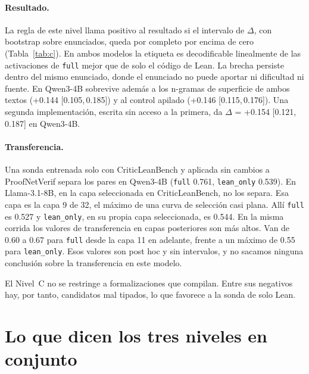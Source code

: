 \documentclass[10pt]{article}
\newcommand{\vr}[1]{\texttt{#1}}
\newcommand{\D}{\Delta}
\newcommand{\ic}[2]{[#1,\,#2]}
\begin{document}
\paragraph{Resultado.}
La regla de este nivel llama positivo al resultado si el intervalo de $\D$, con bootstrap sobre enunciados, queda
por completo por encima de cero (Tabla~\ref{tab:c}). En ambos modelos la etiqueta es decodificable linealmente de las activaciones de \vr{full} mejor que de solo el código de Lean.
La brecha persiste dentro del mismo enunciado, donde el enunciado no puede aportar ni dificultad ni fuente. En
Qwen3-4B sobrevive además a los n-gramas de superficie de ambos textos (+0.144 \ic{0.105}{0.185}) y al control
apilado (+0.146 \ic{0.115}{0.176}). Una segunda implementación, escrita sin acceso a la primera, da $\D$ = +0.154 \ic{0.121}{0.187} en Qwen3-4B.

\paragraph{Transferencia.}
Una sonda entrenada solo con CriticLeanBench y aplicada sin cambios a ProofNetVerif separa los pares en Qwen3-4B
(\vr{full} 0.761, \vr{lean\_only} 0.539). En Llama-3.1-8B, en la capa seleccionada en CriticLeanBench, no los separa.
Esa capa es la capa 9 de 32, el máximo de una curva de selección casi plana. Allí \vr{full} es 0.527 y
\vr{lean\_only}, en su propia capa seleccionada, es 0.544. En la misma corrida los valores de transferencia en capas
posteriores son más altos. Van de 0.60 a 0.67 para \vr{full} desde la capa 11 en adelante, frente a un máximo de
0.55 para \vr{lean\_only}. Esos valores son post hoc y sin intervalos, y no sacamos ninguna conclusión sobre la
transferencia en este modelo.

El Nivel~C no se restringe a formalizaciones que compilan. Entre sus negativos hay, por tanto, candidatos mal
tipados, lo que favorece a la sonda de solo Lean.

\section{Lo que dicen los tres niveles en conjunto}\label{sec:conjunta}
\end{document}
